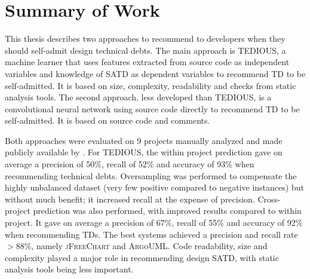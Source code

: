 \label{sec:Conclusion}





\section{Summary of Work}


This thesis describes two approaches to recommend to developers when they should self-admit design technical debts. The main approach is TEDIOUS, a machine learner that uses features extracted from source code as independent variables and knowledge of SATD as dependent variables to recommend TD to be self-admitted. It is based on size, complexity, readability and checks from static analysis tools. The second approach, less developed than TEDIOUS, is a convolutional neural network using source code directly to recommend TD to be self-admitted. It is based on source code and comments.

Both approaches were evaluated on 9 projects manually analyzed and made publicly available by \citet{maldonado17}. For TEDIOUS, the within project prediction gave on average a precision of 50\%, recall of 52\% and accuracy of 93\% when recommending technical debts. Oversampling was performed to compensate the highly unbalanced dataset (very few positive compared to negative instances) but without much benefit; it increased recall at the expense of precision. Cross-project prediction was also performed, with improved results compared to within project. It gave on average a precision of 67\%, recall of 55\% and accuracy of 92\% when recommending TDs. The best systems achieved a precision and recall rate $> 88\%$, namely \textsc{jFreeChart} and \textsc{ArgoUML}. Code readability, size and complexity played a major role in recommending design SATD, with static analysis tools being less important.

